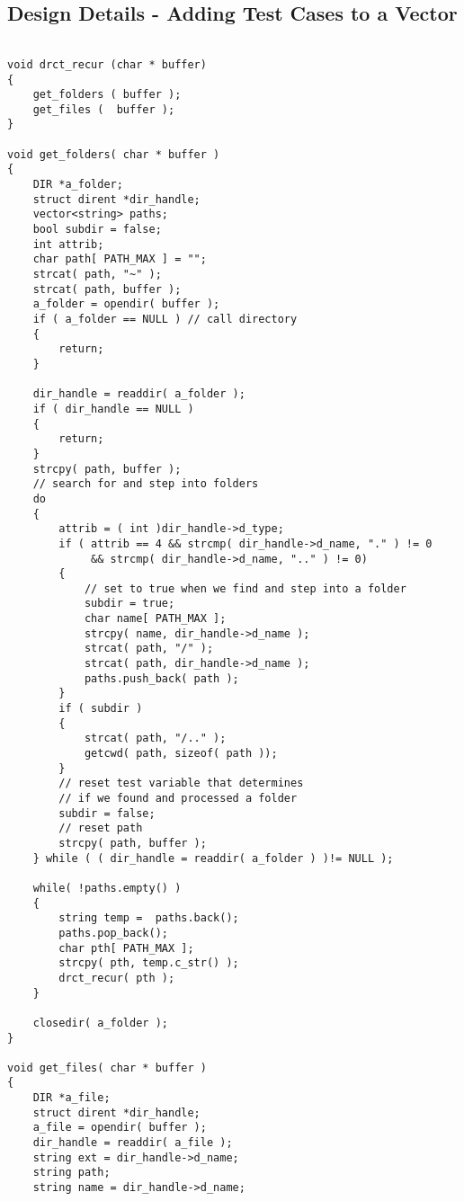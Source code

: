 \subsection{Design Details - Adding Test Cases to a Vector}

\begin{lstlisting}

void drct_recur (char * buffer)
{
    get_folders ( buffer );
    get_files (  buffer );
}

void get_folders( char * buffer )
{
    DIR *a_folder;
    struct dirent *dir_handle;
    vector<string> paths;
    bool subdir = false;
    int attrib;
    char path[ PATH_MAX ] = "";
    strcat( path, "~" );
    strcat( path, buffer );
    a_folder = opendir( buffer );
    if ( a_folder == NULL ) // call directory
    {
        return;
    }

    dir_handle = readdir( a_folder );
    if ( dir_handle == NULL )
    {
        return;
    }
    strcpy( path, buffer );
    // search for and step into folders
    do
    {
        attrib = ( int )dir_handle->d_type;
        if ( attrib == 4 && strcmp( dir_handle->d_name, "." ) != 0
             && strcmp( dir_handle->d_name, ".." ) != 0)
        {
            // set to true when we find and step into a folder
            subdir = true;
            char name[ PATH_MAX ];
            strcpy( name, dir_handle->d_name );
            strcat( path, "/" );
            strcat( path, dir_handle->d_name );
            paths.push_back( path );
        }
        if ( subdir )
        {
            strcat( path, "/.." );
            getcwd( path, sizeof( path ));
        }
        // reset test variable that determines 
        // if we found and processed a folder
        subdir = false;
        // reset path
        strcpy( path, buffer );
    } while ( ( dir_handle = readdir( a_folder ) )!= NULL );

    while( !paths.empty() )
    {   
        string temp =  paths.back();
        paths.pop_back();
        char pth[ PATH_MAX ];
        strcpy( pth, temp.c_str() );
        drct_recur( pth );
    }

    closedir( a_folder );
}

void get_files( char * buffer )
{
    DIR *a_file;
    struct dirent *dir_handle;
    a_file = opendir( buffer );
    dir_handle = readdir( a_file );
    string ext = dir_handle->d_name;
    string path;
    string name = dir_handle->d_name;


\end{lstlisting}
